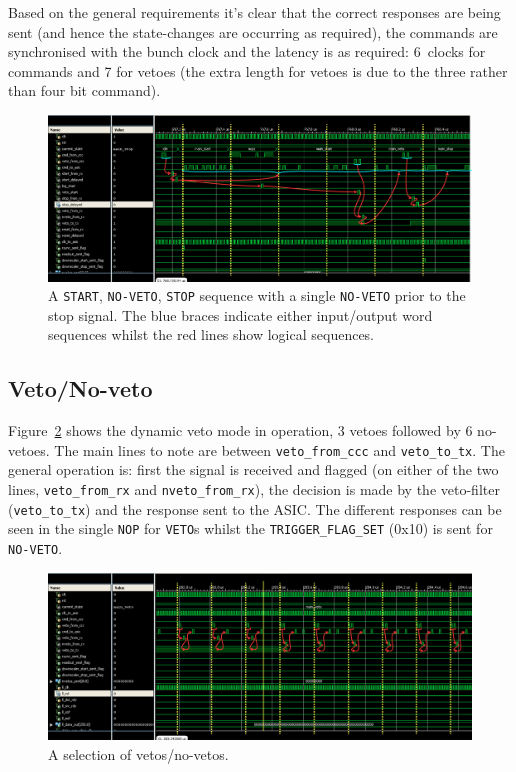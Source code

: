 Based on the general requirements it's clear that the correct responses are being sent (and hence the state-changes are occurring as required), the commands are synchronised with the bunch clock and the latency is as required: 6~clocks for commands and 7 for vetoes (the extra length for vetoes is due to the three rather than four bit command).

\begin{figure}
    \centering
    \includegraphics[width=\textwidth]{images/isim/edited/start-veto-stop.png}
    \caption{A \texttt{START}, \texttt{NO-VETO}, \texttt{STOP} sequence with a single \texttt{NO-VETO} prior to the stop signal. The blue braces indicate either input/output word sequences whilst the red lines show logical sequences.}
    \label{fig:isim_start-veto-stop}
\end{figure}

\clearpage
\subsection{Veto/No-veto} %
\label{sec:veto_no_veto}
Figure~\ref{fig:isim_veto_no_veto} shows the dynamic veto mode in operation, 3 vetoes followed by 6 no-vetoes. The main lines to note are between \texttt{veto\_from\_ccc} and \texttt{veto\_to\_tx}. The general operation is: first the signal is received and flagged (on either of the two lines, \texttt{veto\_from\_rx} and \texttt{nveto\_from\_rx}), the decision is made by the veto-filter (\texttt{veto\_to\_tx}) and the response sent to the ASIC. The different responses can be seen in the single \texttt{NOP} for \texttt{VETO}s whilst the \texttt{TRIGGER\_FLAG\_SET} (0x10) is sent for \texttt{NO-VETO}. 

\begin{figure}
  \centering
  \includegraphics[width=\textwidth]{images/isim/edited/veto_no_veto.png}
  \caption{A selection of vetos/no-vetos.}
  \label{fig:isim_veto_no_veto}
\end{figure}
\clearpage
